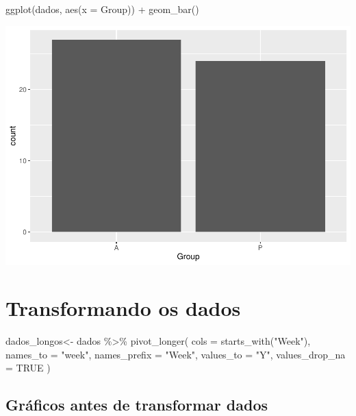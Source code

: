 \documentclass[
]{article}
\newenvironment{Shaded}{\begin{snugshade}}{\end{snugshade}}
\newcommand{\AttributeTok}[1]{\textcolor[rgb]{0.77,0.63,0.00}{#1}}
\newcommand{\ConstantTok}[1]{\textcolor[rgb]{0.00,0.00,0.00}{#1}}
\newcommand{\FunctionTok}[1]{\textcolor[rgb]{0.00,0.00,0.00}{#1}}
\newcommand{\NormalTok}[1]{#1}
\newcommand{\OtherTok}[1]{\textcolor[rgb]{0.56,0.35,0.01}{#1}}
\newcommand{\SpecialCharTok}[1]{\textcolor[rgb]{0.00,0.00,0.00}{#1}}
\newcommand{\StringTok}[1]{\textcolor[rgb]{0.31,0.60,0.02}{#1}}
\begin{document}
\begin{Shaded}
\begin{Highlighting}[]
\FunctionTok{ggplot}\NormalTok{(dados, }\FunctionTok{aes}\NormalTok{(}\AttributeTok{x =}\NormalTok{ Group)) }\SpecialCharTok{+}
  \FunctionTok{geom\_bar}\NormalTok{()}
\end{Highlighting}
\end{Shaded}

\includegraphics{EDA__files/figure-latex/unnamed-chunk-3-2.pdf}

\hypertarget{transformando-os-dados}{%
\section{Transformando os dados}\label{transformando-os-dados}}

\begin{Shaded}
\begin{Highlighting}[]
\NormalTok{dados\_longos}\OtherTok{\textless{}{-}}\NormalTok{ dados }\SpecialCharTok{\%\textgreater{}\%}
  \FunctionTok{pivot\_longer}\NormalTok{(}
    \AttributeTok{cols =} \FunctionTok{starts\_with}\NormalTok{(}\StringTok{"Week"}\NormalTok{),}
    \AttributeTok{names\_to =} \StringTok{"week"}\NormalTok{,}
    \AttributeTok{names\_prefix =} \StringTok{"Week"}\NormalTok{,}
    \AttributeTok{values\_to =} \StringTok{"Y"}\NormalTok{,}
    \AttributeTok{values\_drop\_na =} \ConstantTok{TRUE}
\NormalTok{  )}
\end{Highlighting}
\end{Shaded}

\hypertarget{gruxe1ficos-antes-de-transformar-dados}{%
\subsection{Gráficos antes de transformar
dados}\label{gruxe1ficos-antes-de-transformar-dados}}
\end{document}
